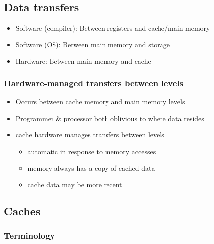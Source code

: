 \documentclass{article}
\begin{document}
\subsection{Data transfers}


\begin{itemize}
	\item Software (compiler): Between registers and cache/main memory
	\item Software (OS): Between main memory and storage
	\item Hardware: Between main memory and cache 
\end{itemize}


\subsubsection{Hardware-managed transfers between levels}


\begin{itemize}
	\item Occurs between cache memory and main memory levels
	\item Programmer \& processor both oblivious to where data resides
	\item cache hardware manages transfers between levels \begin{itemize}
		\item automatic in response to memory accesses
		\item memory always has a copy of cached data
		\item cache data may be more recent
	\end{itemize}
\end{itemize}

\subsection{Caches}


\subsubsection{Terminology}
\end{document}
